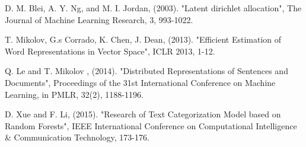 \documentclass[10pt]{article}
\begin{document}
\begin{thebibliography}{9}

D. M. Blei, A. Y. Ng, and M. I. Jordan, (2003). "Latent dirichlet allocation", The Journal of Machine Learning Research, 3, 993-1022.

T. Mikolov, G.s Corrado, K. Chen, J. Dean, (2013). "Efficient Estimation of Word Representations in Vector Space", ICLR 2013, 1-12.

Q. Le and T. Mikolov , (2014). "Distributed Representations of Sentences and Documents", Proceedings of the 31st International Conference on Machine Learning, in PMLR, 32(2), 1188-1196.

D. Xue and F. Li, (2015). "Research of Text Categorization Model based on Random Forests", IEEE International Conference on Computational Intelligence \& Communication Technology, 173-176.

\end{thebibliography}


\end{document}
